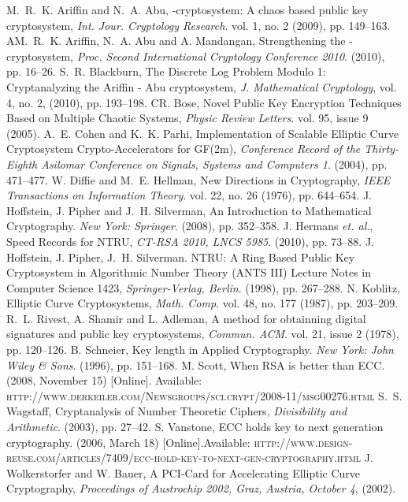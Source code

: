 \documentclass{llncs}
\begin{document}
\begin{thebibliography}{[AA1]}
 M.~R.~K. Ariffin and N.~A. Abu, -cryptosystem: A chaos based public key cryptosystem, \emph{Int. Jour. Cryptology Research}. vol. 1, no. 2 (2009), pp. 149--163.
 AM.~R.~K. Ariffin, N.~A. Abu and A. Mandangan, Strengthening the -cryptosystem, \emph{Proc. Second International Cryptology Conference 2010}. (2010), pp. 16--26.
 S.~R. Blackburn, The Discrete Log Problem Modulo 1: Cryptanalyzing
the Ariffin - Abu cryptosystem, \emph{J. Mathematical Cryptology},
vol. 4, no. 2, (2010), pp. 193--198.
 CR. Bose, Novel Public Key Encryption Techniques Based on Multiple Chaotic Systems, \emph{Physic Review Letters}. vol. 95, issue 9 (2005).
 A.~E. Cohen and K.~K. Parhi, Implementation of Scalable Elliptic Curve Cryptosystem Crypto-Accelerators for GF(2m), \emph{Conference Record of the Thirty-Eighth Asilomar Conference on Signals, Systems and Computers 1}. (2004), pp. 471--477.
 W. Diffie and M.~E. Hellman, New Directions in Cryptography, \emph{IEEE Transactions on Information Theory}. vol. 22, no. 26 (1976), pp. 644--654.
 J. Hoffstein, J. Pipher and J.~H. Silverman, An Introduction to Mathematical Cryptography. \emph{New York: Springer}. (2008), pp. 352--358.
 J. Hermans \textit{et. al.}, Speed Records for NTRU, \emph{CT-RSA 2010, LNCS 5985}. (2010), pp. 73--88.
 J. Hoffstein, J. Pipher, J.~H. Silverman. NTRU: A Ring Based Public Key Cryptosystem in Algorithmic Number Theory (ANTS III) Lecture Notes in Computer Science 1423, \emph{Springer-Verlag, Berlin}. (1998), pp. 267--288.
 N. Koblitz, Elliptic Curve Cryptosystems, \emph{Math. Comp}. vol. 48, no. 177 (1987), pp. 203--209.
 R.~L. Rivest, A. Shamir and L. Adleman, A method for obtainning digital signatures and public key cryptosystems, \emph{Commun. ACM}. vol. 21, issue 2 (1978), pp. 120--126.
 B. Schneier, Key length in Applied Cryptography. \emph{New York: John Wiley \& Sons}. (1996), pp. 151--168.
 M. Scott, When RSA is better than ECC. (2008, November 15) [Online]. Available: \textsc{http://www.derkeiler.com/Newsgroups/sci.crypt/2008-11/msg00276.html}
 S.~S. Wagstaff, Cryptanalysis of Number Theoretic Ciphers, \emph{Divisibility and Arithmetic}. (2003), pp. 27--42.
 S. Vanstone, ECC holds key to next generation cryptography. (2006, March 18) [Online].Available:
\textsc{http://www.design-reuse.com/articles/7409/ecc-hold-key-to-next-gen-cryptography.html}
 J. Wolkerstorfer and W. Bauer, A PCI-Card for Accelerating Elliptic Curve Cryptography, \emph{Proceedings of Austrochip 2002, Graz, Austria, October 4}, (2002).
\end{thebibliography}
 
\end{document}
